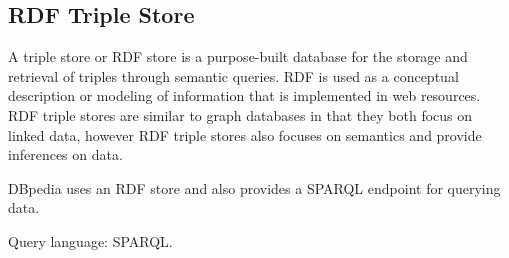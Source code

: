 \subsection{RDF Triple Store}
A triple store or RDF store is a purpose-built database for the storage and retrieval of triples through semantic queries. RDF is used as a conceptual description or modeling of information that is implemented in web resources. RDF triple stores are similar to graph databases in that they both focus on linked data, however RDF triple stores also focuses on semantics and provide inferences on data.

DBpedia uses an RDF store and also provides a SPARQL endpoint for querying data.

Query language: SPARQL.

